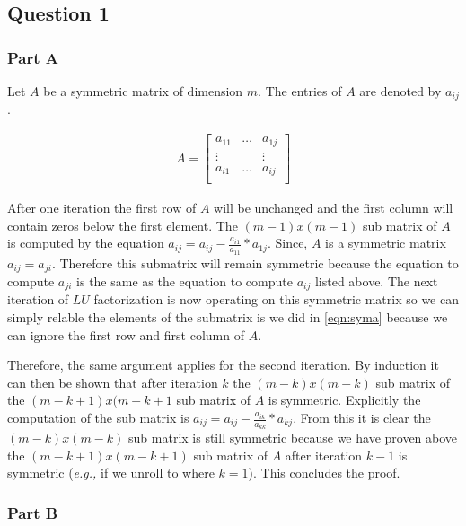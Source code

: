 \subsection{Question 1}
\subsubsection{Part A}

Let \(A\) be a symmetric matrix of dimension \(m\).
The entries of \(A\) are denoted by \(a_{ij}\).

\begin{eqnarray}
  A = 
  \begin{bmatrix}
    a_{11} & \dots & a_{1j} \\
    \vdots & & \vdots \\
    a_{i1} & \dots & a_{ij} \\
  \end{bmatrix}
  \label{eqn:syma}
\end{eqnarray}

After one iteration the first row of \(A\) will be unchanged and the first column will contain zeros below the first element.
The \((m-1)x(m-1)\) sub matrix of \(A\) is computed by the equation \(a_{ij} = a_{ij} - \frac{a_{i1}}{a_{11}}*a_{1j}\).
Since, \(A\) is a symmetric matrix \(a_{ij} = a_{ji}\).
Therefore this submatrix will remain symmetric because the equation to compute \(a_{ji}\) is the same as the equation to compute \(a_{ij}\) listed above.
The next iteration of \(LU\) factorization is now operating on this symmetric matrix so we can simply relable the elements of the submatrix is we did in \ref{eqn:syma} because we can ignore the first row and first column of \(A\).

Therefore, the same argument applies for the second iteration.
By induction it can then be shown that after iteration \(k\) the \((m-k)x(m-k)\) sub matrix of the \((m-k+1)x(m-k+1\) sub matrix of \(A\) is symmetric.
Explicitly the computation of the sub matrix is \(a_{ij} = a_{ij} - \frac{a_{ik}}{a_{kk}}*a_{kj}\).
From this it is clear the \((m-k)x(m-k)\) sub matrix is still symmetric because we have proven above the \((m-k+1)x(m-k+1)\) sub matrix of \(A\) after iteration \(k-1\) is symmetric ({\em e.g.,} if we unroll to where \(k=1\)).
This concludes the proof.

\newpage
\subsubsection{Part B}

